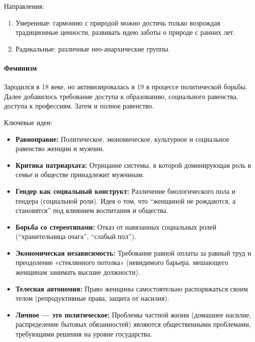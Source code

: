 \documentclass[12pt]{article}
\begin{document}
	\begin{note}
		Направления:
		\begin{enumerate}
			\item Умеренные: гармонию с природой можно достичь только возрождая традиционные ценности, развивать идею заботы о природе с ранних лет.
			\item Радикальные: различные нео-анархические группы.
		\end{enumerate}
	\end{note}
	
	\paragraph{Феминизм}
	
	\begin{note}
		Зародился в 18 веке, но активизировалась в 19 в процессе политической борьбы. Далее добавилось требование доступа к образованию, социального равенства, доступа к профессиям. Затем и полное равенство.
	\end{note}
	
	\begin{note}
		Ключевые идеи:
		
		\begin{itemize}
			\item \textbf{Равноправие:} Политическое, экономическое, культурное и социальное равенство женщин и мужчин.
			\item \textbf{Критика патриархата:} Отрицание системы, в которой доминирующая роль в семье и обществе принадлежит мужчинам.
			\item \textbf{Гендер как социальный конструкт:} Различение биологического пола и гендера (социальной роли). Идея о том, что ``женщиной не рождаются, а становятся'' под влиянием воспитания и общества.
			\item \textbf{Борьба со стереотипами:} Отказ от навязанных социальных ролей (``хранительница очага'', ``слабый пол'').
			\item \textbf{Экономическая независимость:} Требование равной оплаты за равный труд и преодоление «стеклянного потолка» (невидимого барьера, мешающего женщинам занимать высшие должности).
			\item \textbf{Телесная автономия:} Право женщины самостоятельно распоряжаться своим телом (репродуктивные права, защита от насилия).
			\item \textbf{Личное — это политическое:} Проблемы частной жизни (домашнее насилие, распределение бытовых обязанностей) являются общественными проблемами, требующими решения на уровне государства.
		\end{itemize}
	\end{note}
	
\end{document}
